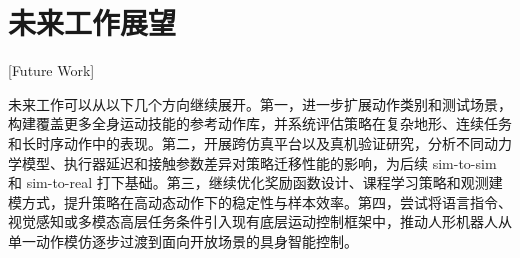 \section{未来工作展望}[Future Work]

未来工作可以从以下几个方向继续展开。第一，进一步扩展动作类别和测试场景，构建覆盖更多全身运动技能的参考动作库，并系统评估策略在复杂地形、连续任务和长时序动作中的表现。第二，开展跨仿真平台以及真机验证研究，分析不同动力学模型、执行器延迟和接触参数差异对策略迁移性能的影响，为后续 sim-to-sim 和 sim-to-real 打下基础。第三，继续优化奖励函数设计、课程学习策略和观测建模方式，提升策略在高动态动作下的稳定性与样本效率。第四，尝试将语言指令、视觉感知或多模态高层任务条件引入现有底层运动控制框架中，推动人形机器人从单一动作模仿逐步过渡到面向开放场景的具身智能控制。
